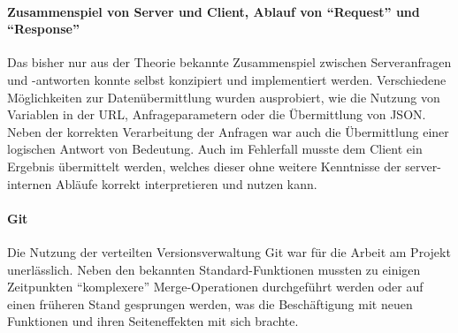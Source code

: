 		
		\paragraph{Zusammenspiel von Server und Client, Ablauf von "`Request"' und "`Response"'}
		Das bisher nur aus der Theorie bekannte Zusammenspiel zwischen Serveranfragen und -ant\-worten konnte selbst konzipiert und implementiert werden. Verschiedene Möglichkeiten zur Datenübermittlung wurden ausprobiert, wie die Nutzung von Variablen in der URL, Anfrageparametern oder die Übermittlung von JSON. Neben der korrekten Verarbeitung der Anfragen war auch die Übermittlung einer logischen Antwort von Bedeutung. Auch im Fehlerfall musste dem Client ein Ergebnis übermittelt werden, welches dieser ohne weitere Kenntnisse der server-internen Abläufe korrekt interpretieren und nutzen kann.
		
		\paragraph{Git}
		Die Nutzung der verteilten Versionsverwaltung Git war für die Arbeit am Projekt unerlässlich. Neben den bekannten Standard-Funktionen mussten zu einigen Zeitpunkten "`komplexere"' Merge-Operationen durchgeführt werden oder auf einen früheren Stand gesprungen werden, was die Beschäftigung mit neuen Funktionen und ihren Seiteneffekten mit sich brachte.